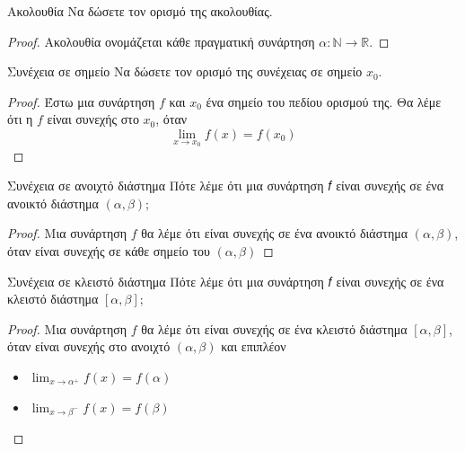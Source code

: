 \documentclass[a4paper, 12pt]{article}
\begin{document}
\begin{theorem}{Ακολουθία}
  Να δώσετε τον ορισμό της ακολουθίας.
\end{theorem}
\begin{proof}
  Ακολουθία ονομάζεται κάθε πραγματική συνάρτηση $α : \mathbb{N} \to \mathbb{R}$.
\end{proof}

\begin{theorem}{Συνέχεια σε σημείο}
  Να δώσετε τον ορισμό της συνέχειας σε σημείο $x_0$.
\end{theorem}
\begin{proof}
  Έστω μια συνάρτηση $f$ και $x_0$ ένα σημείο του πεδίου ορισμού της. Θα λέμε ότι η $f$ είναι συνεχής στο $x_0$, όταν
  $$\lim_{x \to x_0} f(x) = f(x_0)$$
\end{proof}

\begin{theorem}{Συνέχεια σε ανοιχτό διάστημα}
  Πότε λέμε ότι μια συνάρτηση 𝑓 είναι συνεχής σε ένα ανοικτό διάστημα  $(α, β)$;
\end{theorem}
\begin{proof}
  Μια συνάρτηση $f$ θα λέμε ότι είναι συνεχής σε ένα ανοικτό διάστημα $(α, β)$, όταν είναι συνεχής σε κάθε σημείο του $(α, β)$
\end{proof}

\begin{theorem}{Συνέχεια σε κλειστό διάστημα}
  Πότε λέμε ότι μια συνάρτηση 𝑓 είναι συνεχής σε ένα κλειστό διάστημα  $[α, β]$;
\end{theorem}
\begin{proof}
  Μια συνάρτηση $f$ θα λέμε ότι είναι συνεχής σε ένα κλειστό διάστημα $[α, β]$, όταν είναι συνεχής στο ανοιχτό $(α, β)$ και επιπλέον
  \begin{itemize}
    \item $\lim_{x \to α^+} f(x) = f(α)$
    \item $\lim_{x \to β^-} f(x) = f(β)$
  \end{itemize}
\end{proof}


\printindex
\end{document}
